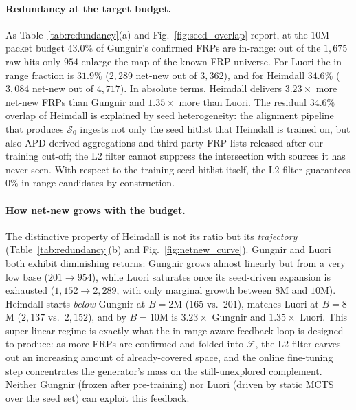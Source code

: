 \documentclass[conference]{IEEEtran}
\begin{document}
\paragraph{Redundancy at the target budget.}  As
Table~\ref{tab:redundancy}(a) and Fig.~\ref{fig:seed_overlap}
report, at the $10$M-packet budget $43.0\%$ of Gungnir's
confirmed FRPs are in-range: out of the $1{,}675$ raw hits only
$954$ enlarge the map of the known FRP universe.  For Luori the
in-range fraction is $31.9\%$ ($2{,}289$ net-new out of
$3{,}362$), and for Heimdall $34.6\%$ ($3{,}084$ net-new out of
$4{,}717$).  In absolute terms, Heimdall delivers $3.23\times$
more net-new FRPs than Gungnir and $1.35\times$ more than Luori.
The residual $34.6\%$ overlap of Heimdall is explained by seed
heterogeneity: the alignment pipeline that produces
$\mathcal{S}_{0}$ ingests not only the seed hitlist that Heimdall
is trained on, but also APD-derived aggregations and third-party
FRP lists released after our training cut-off; the L2 filter
cannot suppress the intersection with sources it has never seen.
With respect to the training seed hitlist itself, the L2 filter
guarantees $0\%$ in-range candidates by construction.

\paragraph{How net-new grows with the budget.}  The distinctive
property of Heimdall is not its ratio but its \emph{trajectory}
(Table~\ref{tab:redundancy}(b) and Fig.~\ref{fig:netnew_curve}).
Gungnir and Luori both exhibit diminishing returns: Gungnir
grows almost linearly but from a very low base
($201\!\to\!954$), while Luori saturates once its seed-driven
expansion is exhausted ($1{,}152\!\to\!2{,}289$, with
only marginal growth between $8$M and $10$M).  Heimdall starts
\emph{below} Gungnir at $B{=}2$M ($165$ vs.\ $201$), matches
Luori at $B{=}8$M ($2{,}137$ vs.\ $2{,}152$), and by $B{=}10$M
is $3.23\times$ Gungnir and $1.35\times$ Luori.  This
super-linear regime is exactly what the in-range-aware feedback
loop is designed to produce: as more FRPs are confirmed and
folded into $\mathcal{F}$, the L2 filter carves out an
increasing amount of already-covered space, and the online
fine-tuning step concentrates the generator's mass on the
still-unexplored complement.  Neither Gungnir (frozen after
pre-training) nor Luori (driven by static MCTS over the seed
set) can exploit this feedback.
\end{document}
